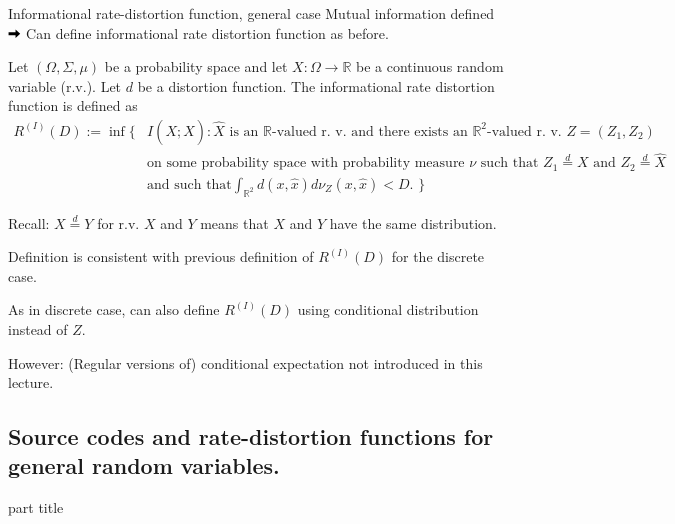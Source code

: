 \begin{frame}{Informational rate-distortion function, general case}
Mutual information defined $\iarrow$ Can define informational rate distortion function as before. 
\begin{definition}
Let $(\Omega,\Sigma,\mu)$ be a probability space and let $X:\Omega\to\mathbb{R}$ be a continuous 
random variable (r.v.). Let $d$ be a distortion function. The informational rate distortion function is defined as 
\begin{align*}
R^{(I)}(D):=\inf\bigl\{&I(X;\hat{X})\colon  \text{$\hat{X}$ is an $\mathbb{R}$-valued r. v.  and there exists an $\mathbb{R}^2$-valued r. v. $Z=(Z_1,Z_2)$}\\ &\text{on some probability space with probability measure $\nu$ such that $Z_1\stackrel{d}{=} X$ and $Z_2\stackrel{d}{=} \hat{X}$} \\ &\text{and such that
$\int_{\mathbb{R}^2}d(x,\hat{x})d\nu_Z(x,\hat{x})<D$. }
\bigr\}
\end{align*}
\end{definition}
\vspace{-0.2cm}
\bit
\item Recall: $X\stackrel{d}{=} Y$ for r.v. $X$ and $Y$ means that $X$ and $Y$ have the same distribution. 
\item Definition is consistent with previous definition of $R^{(I)}(D)$ for the discrete case.
\item As in discrete case, can also define $R^{(I)}(D)$ using conditional distribution instead of $Z$. 
\item However: (Regular versions of) conditional expectation not introduced in this lecture. 
\eit
\end{frame}

\subsection{Source codes and rate-distortion functions for general random variables.}
\begin{frame}
 \vspace{12.0ex}
\begin{center}
\begin{beamercolorbox}[sep=12pt,center]{part title}
\insertsubsection\par
\end{beamercolorbox}
\end{center}
\end{frame}

